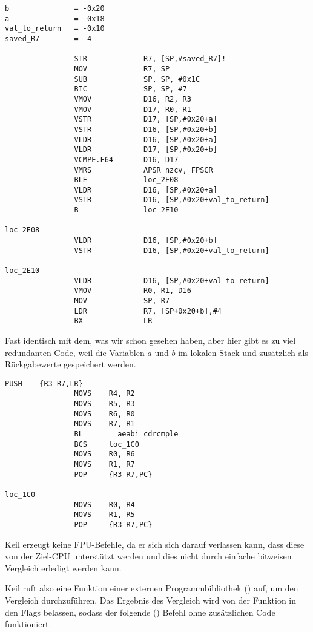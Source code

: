 \begin{lstlisting}[caption=\NonOptimizingXcodeIV (\ARMMode),style=customasmARM]
b               = -0x20
a               = -0x18
val_to_return   = -0x10
saved_R7        = -4

                STR             R7, [SP,#saved_R7]!
                MOV             R7, SP
                SUB             SP, SP, #0x1C
                BIC             SP, SP, #7
                VMOV            D16, R2, R3
                VMOV            D17, R0, R1
                VSTR            D17, [SP,#0x20+a]
                VSTR            D16, [SP,#0x20+b]
                VLDR            D16, [SP,#0x20+a]
                VLDR            D17, [SP,#0x20+b]
                VCMPE.F64       D16, D17
                VMRS            APSR_nzcv, FPSCR
                BLE             loc_2E08
                VLDR            D16, [SP,#0x20+a]
                VSTR            D16, [SP,#0x20+val_to_return]
                B               loc_2E10

loc_2E08
                VLDR            D16, [SP,#0x20+b]
                VSTR            D16, [SP,#0x20+val_to_return]

loc_2E10
                VLDR            D16, [SP,#0x20+val_to_return]
                VMOV            R0, R1, D16
                MOV             SP, R7
                LDR             R7, [SP+0x20+b],#4
                BX              LR
\end{lstlisting}
Fast identisch mit dem, was wir schon gesehen haben, aber hier gibt es zu viel redundanten Code, weil die Variablen $a$
und $b$ im lokalen Stack und zusätzlich als Rückgabewerte gespeichert werden.

\myparagraph{\OptimizingKeilVI (\ThumbMode)}

\begin{lstlisting}[caption=\OptimizingKeilVI (\ThumbMode),style=customasmARM]
                PUSH    {R3-R7,LR}
                MOVS    R4, R2
                MOVS    R5, R3
                MOVS    R6, R0
                MOVS    R7, R1
                BL      __aeabi_cdrcmple
                BCS     loc_1C0
                MOVS    R0, R6
                MOVS    R1, R7
                POP     {R3-R7,PC}

loc_1C0
                MOVS    R0, R4
                MOVS    R1, R5
                POP     {R3-R7,PC}
\end{lstlisting}

Keil erzeugt keine FPU-Befehle, da er sich sich darauf verlassen kann, dass diese von der Ziel-CPU unterstützt werden
und dies nicht durch einfache bitweisen Vergleich erledigt werden kann.

Keil ruft also eine Funktion einer externen Programmbibliothek () auf, um den Vergleich
durchzuführen.
Das Ergebnis des Vergleich wird von der Funktion in den Flags belassen, sodass der folgende  () Befehl ohne zusätzlichen Code funktioniert.

